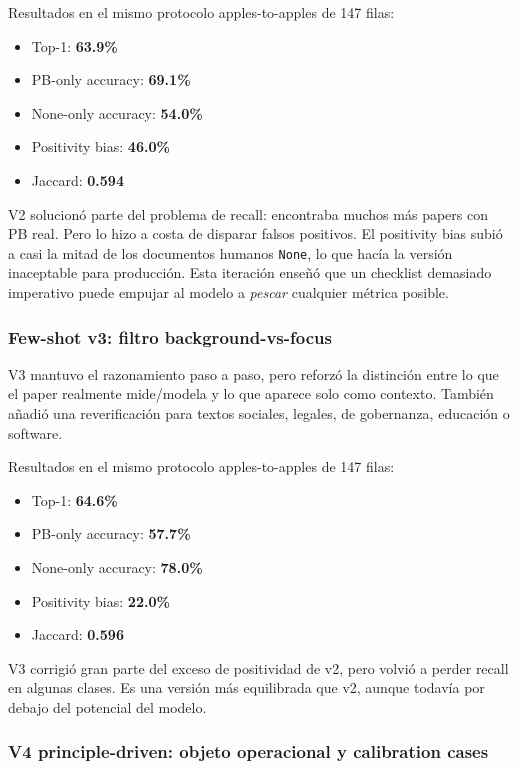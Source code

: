 Resultados en el mismo protocolo apples-to-apples de 147 filas:

\begin{itemize}
\item Top-1: \textbf{63.9\%}
\item PB-only accuracy: \textbf{69.1\%}
\item None-only accuracy: \textbf{54.0\%}
\item Positivity bias: \textbf{46.0\%}
\item Jaccard: \textbf{0.594}
\end{itemize}

V2 solucionó parte del problema de recall: encontraba muchos más papers con PB real. Pero lo hizo a costa de disparar falsos positivos. El positivity bias subió a casi la mitad de los documentos humanos \texttt{None}, lo que hacía la versión inaceptable para producción. Esta iteración enseñó que un checklist demasiado imperativo puede empujar al modelo a \emph{pescar} cualquier métrica posible.

\subsubsection{Few-shot v3: filtro background-vs-focus}

V3 mantuvo el razonamiento paso a paso, pero reforzó la distinción entre lo que el paper realmente mide/modela y lo que aparece solo como contexto. También añadió una reverificación para textos sociales, legales, de gobernanza, educación o software.

Resultados en el mismo protocolo apples-to-apples de 147 filas:

\begin{itemize}
\item Top-1: \textbf{64.6\%}
\item PB-only accuracy: \textbf{57.7\%}
\item None-only accuracy: \textbf{78.0\%}
\item Positivity bias: \textbf{22.0\%}
\item Jaccard: \textbf{0.596}
\end{itemize}

V3 corrigió gran parte del exceso de positividad de v2, pero volvió a perder recall en algunas clases. Es una versión más equilibrada que v2, aunque todavía por debajo del potencial del modelo.

\subsubsection{V4 principle-driven: objeto operacional y calibration cases}

